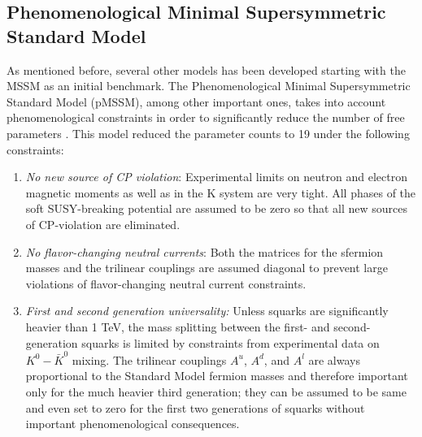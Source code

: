\FloatBarrier

\subsection{Phenomenological Minimal Supersymmetric Standard Model }

\FloatBarrier

As mentioned before, several other models has been developed starting with the MSSM as an initial benchmark. The Phenomenological Minimal Supersymmetric Standard Model (pMSSM), among other important ones, takes into account phenomenological constraints in order to significantly reduce the number of free parameters \cite{Djouadi:1998di}. This model reduced the parameter counts to 19 under the following constraints:
\begin{enumerate}
	\item \emph{No new source of CP violation}: Experimental limits on neutron and electron magnetic moments as well as in the K system are very tight. All phases of the soft SUSY-breaking potential are assumed to be zero so that all new sources of CP-violation are eliminated.
	\item \emph{No flavor-changing neutral currents}: Both the matrices for the sfermion masses and the trilinear couplings are assumed diagonal to prevent large violations of flavor-changing neutral current constraints.
	\item \emph{First and second generation universality:} Unless squarks are significantly heavier than 1 TeV, the mass splitting between the first- and second-generation squarks is limited by constraints from experimental data on $K^0-\bar{K}^0$ mixing. The trilinear couplings $A^u$, $A^d$, and $A^l$ are always proportional to the Standard Model fermion masses and therefore important only for the much heavier third generation; they can be assumed to be same and even set to zero for the first two generations of squarks without important phenomenological consequences.
\end{enumerate}

